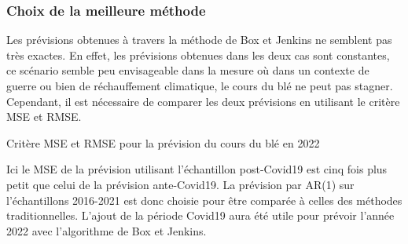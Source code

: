 \subsubsection{Choix de la meilleure méthode}
Les prévisions obtenues à travers la méthode de Box et Jenkins ne semblent pas très exactes. En effet, les prévisions obtenues dans les deux cas sont constantes, ce
scénario semble peu envisageable dans la mesure où dans un contexte de guerre ou bien de réchauffement climatique, le cours du blé ne peut pas stagner. Cependant, il est
nécessaire de comparer les deux prévisions en utilisant le critère MSE et RMSE.
\begin{table}[H]
    \centering
    \caption{Critère MSE et RMSE pour la prévision du cours du blé en 2022}
    \sffamily
    
\end{table}
Ici le MSE de la prévision utilisant l'échantillon post-Covid19 est cinq fois plus petit que celui de la prévision ante-Covid19. La prévision par AR(1) sur l'échantillons
2016-2021 est donc choisie pour être comparée à celles des méthodes traditionnelles. L'ajout de la période Covid19 aura été utile pour prévoir l'année 2022 avec 
l'algorithme de Box et Jenkins.
